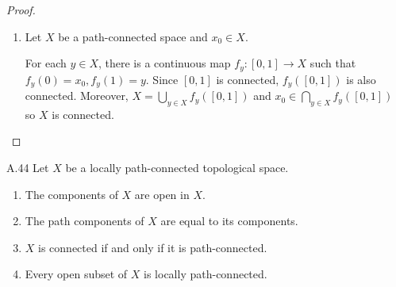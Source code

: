 \begin{proof}
\begin{enumerate}[itemsep=0pt,label={(\alph*)}]
\begin{itemize}
                        This follows directly from (a) as every quotient map is continuous and surjective.
              \end{itemize}
        \item Let \( X \) be a path-connected space and \( x_{0} \in X \).

              For each \( y \in X \), there is a continuous map \( f_{y}: [0, 1] \to X \) such that \( f_{y}(0) = x_{0}, f_{y}(1) = y \). Since \( [0, 1] \) is connected, \( f_{y}([0, 1]) \) is also connected. Moreover, \( X = \bigcup_{y \in X} f_{y}([0, 1]) \) and \( x_{0} \in \bigcap_{y\in X} f_{y}([0, 1]) \) so \( X \) is connected.
    \end{enumerate}
\end{proof}

\begin{exercise}{A.44}
    Let \( X \) be a locally path-connected topological space.
    \begin{enumerate}[itemsep=0pt,label={(\alph*)}]
        \item The components of \( X \) are open in \( X \).
        \item The path components of \( X \) are equal to its components.
        \item \( X \) is connected if and only if it is path-connected.
        \item Every open subset of \( X \) is locally path-connected.
    \end{enumerate}
\end{exercise}

